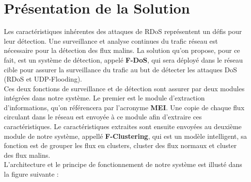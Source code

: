 \section{Présentation de la Solution}
Les caractéristiques inhérentes des attaques de RDoS représentent un défis pour leur détection. Une surveillance et analyse continues du trafic réseau est nécessaire pour la détection des flux malins. La solution qu'on propose, pour ce fait, est un système de détection, appelé \textbf{F-DoS}, qui sera déployé dans le réseau cible pour assurer la surveillance du trafic au but de détecter les attaques DoS (RDoS et UDP-Flooding).\\

Ces deux fonctions de surveillance et de détection sont assurer par deux modules intégrées dans notre système. Le
premier est le module d'extraction d'informations, qu'on référencera par l'acronyme \textbf{MEI}. Une copie de chaque flux circulant dans le réseau est envoyée à ce module afin d'extraire ces caractéristiques. Le caractéristiques extraites sont ensuite envoyées au deuxième module de notre système, appellé \textbf{F-Clustering}, qui est un modèle intelligent, sa fonction est de grouper les flux en clusters, cluster des flux normaux et cluster des flux malins.\\

L'architecture et le principe de fonctionnement de notre système est illusté dans la figure suivante : \\

